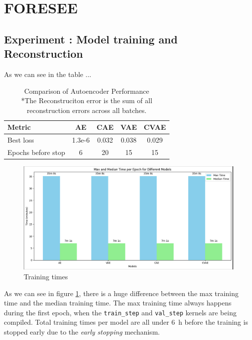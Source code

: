 \section{FORESEE}
\label{res:tinydas}


\subsection{Experiment : Model training and Reconstruction}

As we can see in the table ...




\begin{table}[!htbp]
    \centering
    \begin{tabular}{lcccc}
        \hline
        \textbf{Metric} & \textbf{AE} & \textbf{CAE} & \textbf{VAE} & \textbf{CVAE} \\
        \hline
        Best loss & 1.3e-6 & 0.032 & 0.038 & 0.029 \\
        Epochs before stop & 6 & 20 & 15 & 15 \\
        \hline
    \end{tabular}
    \caption{Comparison of Autoencoder Performance\\ *The Reconstruciton error is the sum of all reconstruction errors across all batches.}
    \label{tab:autoencoder_comparison}
\end{table}

\begin{figure}[!h]
    \centering
    \includegraphics[scale=0.4]{figures/time.png}
    \caption{Training times}
    \label{fig:traintimes}
\end{figure}

As we can see in figure \ref{fig:traintimes}, there is a huge difference between the max training time and the median training time. The max training time always happens during the first epoch, when the \texttt{train\_step} and \texttt{val\_step} kernels are being compiled. Total training times per model are all under \qty{6}{\si{\hour}} before the training is stopped early due to the \textit{early stopping} mechanism.

